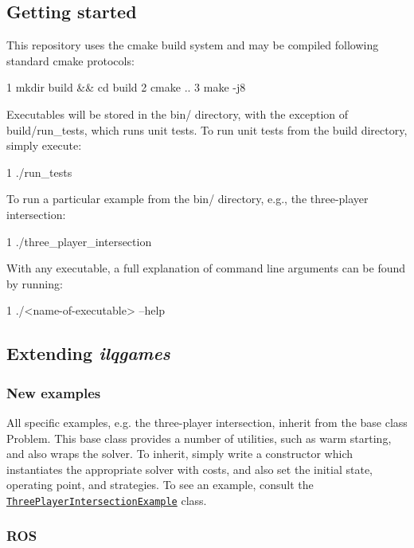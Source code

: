 \subsection*{Getting started}

This repository uses the {\ttfamily cmake} build system and may be compiled following standard cmake protocols\+: 
\begin{DoxyCode}
1 mkdir build && cd build
2 cmake ..
3 make -j8
\end{DoxyCode}


Executables will be stored in the {\ttfamily bin/} directory, with the exception of {\ttfamily build/run\+\_\+tests}, which runs unit tests. To run unit tests from the build directory, simply execute\+: 
\begin{DoxyCode}
1 ./run\_tests
\end{DoxyCode}


To run a particular example from the {\ttfamily bin/} directory, e.\+g., the three-\/player intersection\+: 
\begin{DoxyCode}
1 ./three\_player\_intersection
\end{DoxyCode}


With any executable, a full explanation of command line arguments can be found by running\+: 
\begin{DoxyCode}
1 ./<name-of-executable> --help
\end{DoxyCode}


\subsection*{Extending {\itshape ilqgames}}

\subsubsection*{New examples}

All specific examples, e.\+g. the three-\/player intersection, inherit from the base class {\ttfamily Problem}. This base class provides a number of utilities, such as warm starting, and also wraps the solver. To inherit, simply write a constructor which instantiates the appropriate solver with costs, and also set the initial state, operating point, and strategies. To see an example, consult the \href{https://github.com/HJReachability/ilqgames/blob/master/src/three_player_intersection_example.cpp}{\tt Three\+Player\+Intersection\+Example} class.

\subsubsection*{R\+OS}

